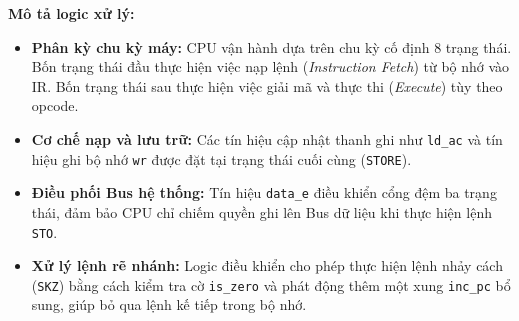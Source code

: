 \textbf{Mô tả logic xử lý:}
\begin{itemize}
    \item \textbf{Phân kỳ chu kỳ máy:} CPU vận hành dựa trên chu kỳ cố định 8 trạng thái. 
    Bốn trạng thái đầu thực hiện việc nạp lệnh (\textit{Instruction Fetch}) từ bộ nhớ vào IR. 
    Bốn trạng thái sau thực hiện việc giải mã và thực thi (\textit{Execute}) tùy theo opcode.
    \item \textbf{Cơ chế nạp và lưu trữ:} Các tín hiệu cập nhật thanh ghi như \texttt{ld\_ac} và tín hiệu ghi bộ nhớ \texttt{wr} 
    được đặt tại trạng thái cuối cùng (\texttt{STORE}).
    \item \textbf{Điều phối Bus hệ thống:} Tín hiệu \texttt{data\_e} điều khiển cổng đệm ba trạng thái, 
    đảm bảo CPU chỉ chiếm quyền ghi lên Bus dữ liệu khi thực hiện lệnh \texttt{STO}.
    \item \textbf{Xử lý lệnh rẽ nhánh:} Logic điều khiển cho phép thực hiện lệnh nhảy cách (\texttt{SKZ}) bằng cách kiểm tra cờ \texttt{is\_zero} 
    và phát động thêm một xung \texttt{inc\_pc} bổ sung, giúp bỏ qua lệnh kế tiếp trong bộ nhớ.
\end{itemize}